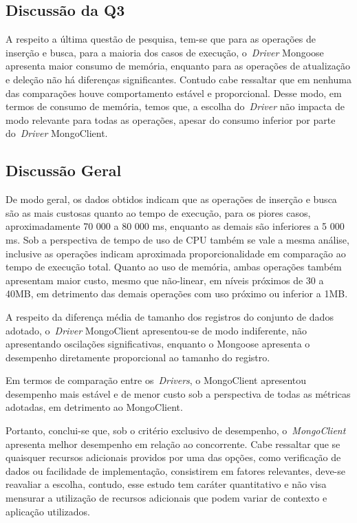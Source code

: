 \documentclass[12pt]{article}
\begin{document}
\subsection{Discussão da Q3}
\label{q3}

A respeito a última questão de pesquisa, tem-se que para as operações de inserção e busca, para a maioria dos casos de execução, o~\emph{Driver} Mongoose apresenta maior consumo de memória, enquanto para as operações de atualização e deleção não há diferenças significantes.
Contudo cabe ressaltar que em nenhuma das comparações houve comportamento estável e proporcional.
Desse modo, em termos de consumo de memória, temos que, a escolha do~\emph{Driver} não impacta de modo relevante para todas as operações, apesar do consumo inferior por parte do~\emph{Driver} MongoClient.

\subsection{Discussão Geral}
\label{qgeral}

De modo geral, os dados obtidos indicam que as operações de inserção e busca são as mais custosas quanto ao tempo de execução, para os piores casos, aproximadamente 70 000 a 80 000 ms, enquanto as demais são inferiores a 5 000 ms.
Sob a perspectiva de tempo de uso de CPU também se vale a mesma análise, inclusive as operações indicam aproximada proporcionalidade em comparação ao tempo de execução total.
Quanto ao uso de memória, ambas operações também apresentam maior custo, mesmo que não-linear, em níveis próximos de 30 a 40MB, em detrimento das demais operações com uso próximo ou inferior a 1MB.

A respeito da diferença média de tamanho dos registros do conjunto de dados adotado, o~\emph{Driver} MongoClient apresentou-se de modo indiferente, não apresentando oscilações significativas, enquanto o Mongoose apresenta o desempenho diretamente proporcional ao tamanho do registro.

Em termos de comparação entre os~\emph{Drivers}, o MongoClient apresentou desempenho mais estável e de menor custo sob a perspectiva de todas as métricas adotadas, em detrimento ao MongoClient.

Portanto, conclui-se que, sob o critério exclusivo de desempenho, o~\emph{MongoClient} apresenta melhor desempenho em relação ao concorrente.
Cabe ressaltar que se quaisquer recursos adicionais providos por uma das opções, como verificação de dados ou facilidade de implementação, consistirem em fatores relevantes, deve-se reavaliar a escolha, contudo, esse estudo tem caráter quantitativo e não visa mensurar a utilização de recursos adicionais que podem variar de contexto e aplicação utilizados.
\end{document}
